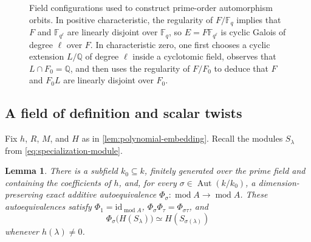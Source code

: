 \documentclass[11pt,letterpaper,reqno]{amsart}
\newtheorem{lemma}[lemma]{Lemma}
\theoremstyle{definition}
\DeclareMathOperator{\Aut}{Aut}
\newcommand{\modcat}{\operatorname{mod}}
\newcommand{\id}{\mathrm{id}}
\begin{document}
\begin{figure}[htbp]
\begin{minipage}[t]{0.48\textwidth}
\end{minipage}

\caption{Field configurations used to construct prime-order automorphism orbits. In positive characteristic, the regularity of $F/\mathbb{F}_{q}$ implies that $F$ and $\mathbb{F}_{q^\ell}$ are linearly disjoint over $\mathbb{F}_{q}$, so $E=F\mathbb{F}_{q^\ell}$ is cyclic Galois of degree $\ell$ over $F$. 
In characteristic zero, one first chooses a cyclic extension $L/\mathbb{Q}$ of degree $\ell$ inside a cyclotomic field, observes that $L\cap F_0=\mathbb{Q}$, and then uses the regularity of $F/F_0$ to deduce that $F$ and $F_0L$ are linearly disjoint over $F_0$.}
\label{fig:field-configurations}
\end{figure}

\subsection{A field of definition and scalar twists}
\label{subsec:scalar-twists}

Fix $h$, $R$, $M$, and $H$ as in
\cref{lem:polynomial-embedding}.  Recall the modules $S_\lambda$ from
\eqref{eq:specialization-module}.

\begin{lemma}\label{lem:scalar-twist}
There is a subfield $k_0\subseteq k$, finitely generated over the prime
field and containing the coefficients of $h$, and, for every
$\sigma\in\Aut(k/k_0)$, a dimension-preserving exact additive
autoequivalence $\Phi_\sigma:\modcat A\longrightarrow\modcat A$. These autoequivalences satisfy $\Phi_1=\id_{\modcat A}$, $\Phi_\sigma\Phi_\tau=\Phi_{\sigma\tau}$, and
\begin{equation}\label{eq:scalar-equivariance}
\Phi_\sigma\bigl(H(S_\lambda)\bigr)
 \simeq H(S_{\sigma(\lambda)})
\end{equation}
whenever $h(\lambda)\neq0$.
\end{lemma}
\end{document}
